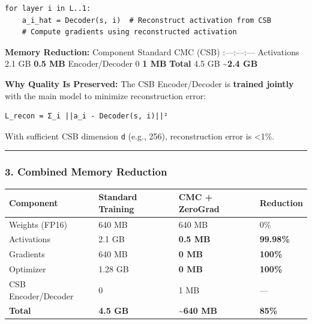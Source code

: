 \documentclass[
  11pt,
  a4paper,
]{article}
\begin{document}
\begin{verbatim}
for layer i in L..1:
    a_i_hat = Decoder(s, i)  # Reconstruct activation from CSB
    # Compute gradients using reconstructed activation
\end{verbatim}

\textbf{Memory Reduction:} \textbar{} Component \textbar{} Standard
\textbar{} CMC (CSB) \textbar{}
\textbar:---\textbar:---\textbar:---\textbar{} \textbar{} Activations
\textbar{} 2.1 GB \textbar{} \textbf{0.5 MB} \textbar{} \textbar{}
Encoder/Decoder \textbar{} 0 \textbar{} \textbf{1 MB} \textbar{}
\textbar{} \textbf{Total} \textbar{} 4.5 GB \textbar{}
\textbf{\textasciitilde2.4 GB} \textbar{}

\textbf{Why Quality Is Preserved:} The CSB Encoder/Decoder is
\textbf{trained jointly} with the main model to minimize reconstruction
error:

\begin{verbatim}
L_recon = Σ_i ||a_i - Decoder(s, i)||²
\end{verbatim}

With sufficient CSB dimension \texttt{d} (e.g., 256), reconstruction
error is \textless1\%.

\begin{center}\rule{0.5\linewidth}{0.5pt}\end{center}

\subsubsection{3. Combined Memory
Reduction}\label{combined-memory-reduction}

\begin{longtable}[]{@{}llll@{}}
\toprule\noalign{}
Component & Standard Training & CMC + ZeroGrad & Reduction \\
\midrule\noalign{}
\endhead
\bottomrule\noalign{}
\endlastfoot
Weights (FP16) & 640 MB & 640 MB & 0\% \\
Activations & 2.1 GB & \textbf{0.5 MB} & \textbf{99.98\%} \\
Gradients & 640 MB & \textbf{0 MB} & \textbf{100\%} \\
Optimizer & 1.28 GB & \textbf{0 MB} & \textbf{100\%} \\
CSB Encoder/Decoder & 0 & 1 MB & --- \\
\textbf{Total} & \textbf{4.5 GB} & \textbf{\textasciitilde640 MB} &
\textbf{85\%} \\
\end{longtable}
\end{document}
